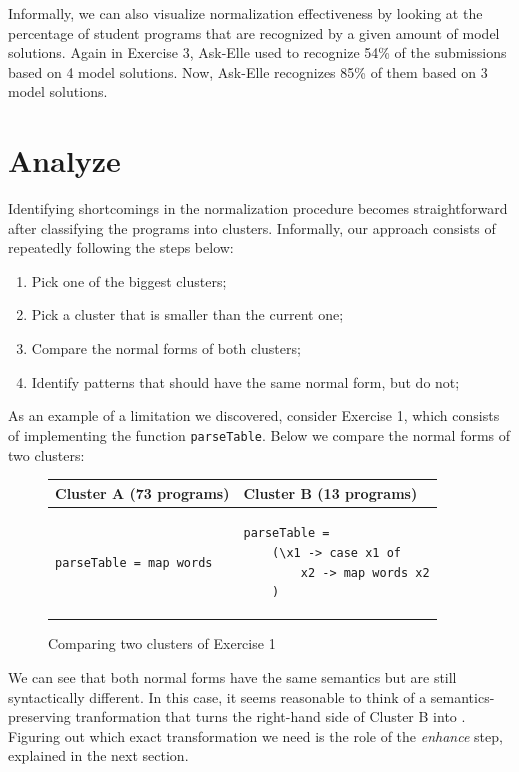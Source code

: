 Informally, we can also visualize normalization effectiveness by looking at the percentage of student programs that are recognized by a given amount of model solutions. Again in Exercise 3, Ask-Elle used to recognize 54\% of the submissions based on 4 model solutions. Now, Ask-Elle recognizes 85\% of them based on 3 model solutions.

\section{Analyze}

Identifying shortcomings in the normalization procedure becomes straightforward after classifying the programs into clusters. Informally, our approach consists of repeatedly following the steps below:

\begin{enumerate}
\item Pick one of the biggest clusters;
\item Pick a cluster that is smaller than the current one;
\item Compare the normal forms of both clusters;
\item Identify patterns that should have the same normal form, but do not;
\end{enumerate}

As an example of a limitation we discovered, consider Exercise 1, which consists of implementing the function \texttt{parseTable}. Below we compare the normal forms of two clusters:

\begin{figure}[H]
\centering
\begin{tabular}{ m{13em} | m{13em} }
    Cluster A (73 programs) & Cluster B (13 programs) \\
    \hline
    \begin{verbatim}
parseTable = map words
    \end{verbatim}
    &
    \begin{verbatim}
parseTable =
    (\x1 -> case x1 of
        x2 -> map words x2
    )
    \end{verbatim}
\end{tabular}
\caption{Comparing two clusters of Exercise 1}
\label{fig:method-comparing-clusters}
\end{figure}

We can see that both normal forms have the same semantics but are still syntactically different. In this case, it seems reasonable to think of a semantics-preserving tranformation that turns the right-hand side of Cluster B into . Figuring out which exact transformation we need is the role of the \emph{enhance} step, explained in the next section.

